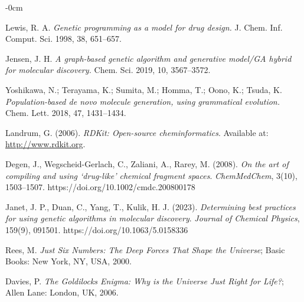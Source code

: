 \documentclass[life,article,submit,pdftex,moreauthors]{Definitions/mdpi}
\begin{document}
\begin{adjustwidth}{-\extralength}{0cm}
{\begin{thebibliography}{999}
Lewis, R. A.
\textit{Genetic programming as a model for drug design.}
J. Chem. Inf. Comput. Sci. 1998, 38, 651--657.

Jensen, J. H.
\textit{A graph-based genetic algorithm and generative model/GA hybrid for molecular discovery.}
Chem. Sci. 2019, 10, 3567--3572.

Yoshikawa, N.; Terayama, K.; Sumita, M.; Homma, T.; Oono, K.; Tsuda, K.
\textit{Population-based de novo molecule generation, using grammatical evolution.}
Chem. Lett. 2018, 47, 1431--1434.

Landrum, G. (2006). \textit{RDKit: Open-source cheminformatics}. Available at: \url{http://www.rdkit.org}.

Degen, J., Wegscheid-Gerlach, C., Zaliani, A., Rarey, M. (2008).
\textit{On the art of compiling and using ‘drug-like’ chemical fragment spaces}.
\textit{ChemMedChem}, 3(10), 1503–1507. https://doi.org/10.1002/cmdc.200800178

Janet, J. P., Duan, C., Yang, T., Kulik, H. J. (2023).
\textit{Determining best practices for using genetic algorithms in molecular discovery}.
\textit{Journal of Chemical Physics}, 159(9), 091501. https://doi.org/10.1063/5.0158336

Rees, M. \textit{Just Six Numbers: The Deep Forces That Shape the Universe}; Basic Books: New York, NY, USA, 2000.

Davies, P. \textit{The Goldilocks Enigma: Why is the Universe Just Right for Life?}; Allen Lane: London, UK, 2006.


\end{thebibliography}
}



%



\end{adjustwidth}
\end{document}
